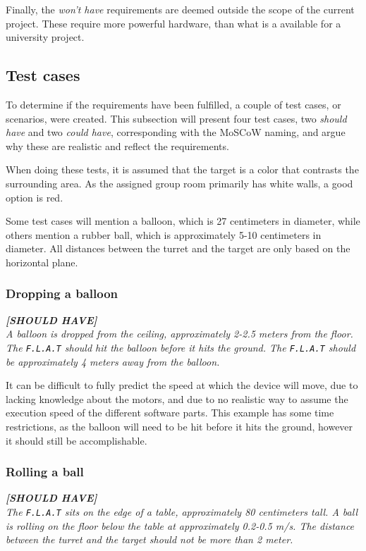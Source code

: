 Finally, the \textit{won't have} requirements are deemed outside the scope of the current project.
These require more powerful hardware, than what is a available for a university project.

\subsection{Test cases}
To determine if the requirements have been fulfilled, a couple of test cases, or scenarios, were created.
This subsection will present four test cases, two \textit{should have} and two \textit{could have}, corresponding with the MoSCoW naming, and argue why these are realistic and reflect the requirements.


When doing these tests, it is assumed that the target is a color that contrasts the surrounding area.
As the assigned group room primarily has white walls, a good option is red.


Some test cases will mention a balloon, which is 27 centimeters in diameter, while others mention a rubber ball, which is approximately 5-10 centimeters in diameter.
All distances between the turret and the target are only based on the horizontal plane.

\subsubsection{Dropping a balloon}
\textit{\textbf{[SHOULD HAVE]}}\\
\textit{A balloon is dropped from the ceiling, approximately 2-2.5 meters from the floor.
The \texttt{F.L.A.T} should hit the balloon before it hits the ground.
The \texttt{F.L.A.T} should be approximately 4 meters away from the balloon.}

It can be difficult to fully predict the speed at which the device will move, due to lacking knowledge about the motors, and due to no realistic way to assume the execution speed of the different software parts.
This example has some time restrictions, as the balloon will need to be hit before it hits the ground, however it should still be accomplishable.

\subsubsection{Rolling a ball}
\textit{\textbf{[SHOULD HAVE]}}\\
\textit{The \texttt{F.L.A.T} sits on the edge of a table, approximately 80 centimeters tall.
A ball is rolling on the floor below the table at approximately 0.2-0.5 m/s.
The distance between the turret and the target should not be more than 2 meter.}

